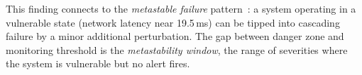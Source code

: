  This finding connects to the \emph{metastable failure}
pattern~\cite{bronson-metastable}: a system operating in a vulnerable state
(network latency near 19.5\,ms) can be tipped into cascading failure by a
minor additional perturbation. The gap between danger zone and monitoring
threshold is the \emph{metastability window}, the range of severities where
the system is vulnerable but no alert fires.
